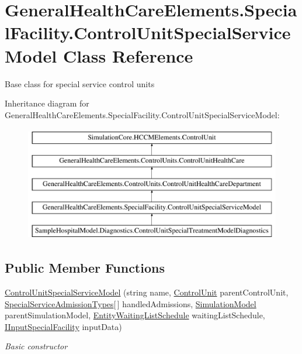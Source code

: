 \hypertarget{class_general_health_care_elements_1_1_special_facility_1_1_control_unit_special_service_model}{}\section{General\+Health\+Care\+Elements.\+Special\+Facility.\+Control\+Unit\+Special\+Service\+Model Class Reference}
\label{class_general_health_care_elements_1_1_special_facility_1_1_control_unit_special_service_model}


Base class for special service control units  


Inheritance diagram for General\+Health\+Care\+Elements.\+Special\+Facility.\+Control\+Unit\+Special\+Service\+Model\+:\begin{figure}[H]
\begin{center}
\leavevmode
\includegraphics[height=5.000000cm]{class_general_health_care_elements_1_1_special_facility_1_1_control_unit_special_service_model}
\end{center}
\end{figure}
\subsection*{Public Member Functions}
\begin{DoxyCompactItemize}
\item 
\hyperlink{class_general_health_care_elements_1_1_special_facility_1_1_control_unit_special_service_model_a73e6e91754ffc85a9a709d69c47490bb}{Control\+Unit\+Special\+Service\+Model} (string name, \hyperlink{class_simulation_core_1_1_h_c_c_m_elements_1_1_control_unit}{Control\+Unit} parent\+Control\+Unit, \hyperlink{class_general_health_care_elements_1_1_treatment_admission_types_1_1_special_service_admission_types}{Special\+Service\+Admission\+Types}\mbox{[}$\,$\mbox{]} handled\+Admissions, \hyperlink{class_simulation_core_1_1_simulation_classes_1_1_simulation_model}{Simulation\+Model} parent\+Simulation\+Model, \hyperlink{class_general_health_care_elements_1_1_booking_models_1_1_entity_waiting_list_schedule}{Entity\+Waiting\+List\+Schedule} waiting\+List\+Schedule, \hyperlink{interface_general_health_care_elements_1_1_special_facility_1_1_i_input_special_facility}{I\+Input\+Special\+Facility} input\+Data)
\begin{DoxyCompactList}\small\item\em Basic constructor \end{DoxyCompactList}\end{DoxyCompactItemize}
